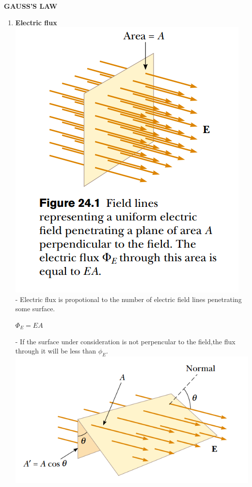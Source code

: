 \documentclass[10pt]{article}
\begin{document}
\pagebreak
\begin{center}
\textbf{GAUSS'S LAW}
\end{center}
\begin{enumerate}
    \item \textbf{Electric flux}\\
    \includegraphics{hinh7}\\
     - Electric flux is propotional to the number of electric field lines penetrating some surface.
     \begin{mybox}
     \begin{center}
     $\Phi_E = EA$
     \end{center}
     \end{mybox}
     - If the surface under consideration is not perpencular to the field,the flux through it will be less than $\phi_E$.\\
     \includegraphics{hinh8}

\end{enumerate}
\end{document}
